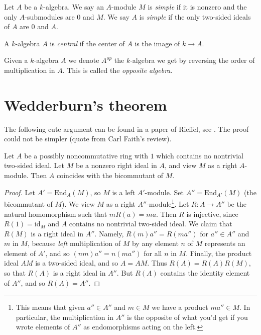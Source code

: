 \begin{definition}
\label{definition-simple}
Let $A$ be a $k$-algebra.
We say an $A$-module $M$ is {\it simple} if it is nonzero and
the only $A$-submodules are $0$ and $M$.
We say $A$ is {\it simple} if the only two-sided ideals of $A$ are
$0$ and $A$.
\end{definition}

\begin{definition}
\label{definition-central}
A $k$-algebra $A$ is {\it central} if the center of $A$ is the image of
$k \to A$.
\end{definition}

\begin{definition}
\label{definition-opposite}
Given a $k$-algebra $A$ we denote $A^{op}$ the $k$-algebra we get by
reversing the order of multiplication in $A$. This is called the
{\it opposite algebra}.
\end{definition}




\section{Wedderburn's theorem}
\label{section-wedderburn}

\noindent
The following cute argument can be found in a paper of Rieffel, see
\cite{Rieffel}. The proof could not be simpler (quote from
Carl Faith's review).

\begin{lemma}
\label{lemma-rieffel}
Let $A$ be a possibly noncommutative ring with $1$ which contains no
nontrivial two-sided ideal. Let $M$ be a nonzero right ideal in $A$,
and view $M$ as a right $A$-module. Then $A$ coincides with the
bicommutant of $M$.
\end{lemma}

\begin{proof}
Let $A' = \text{End}_A(M)$, so $M$ is a left $A'$-module.
Set $A'' = \text{End}_{A'}(M)$ (the bicommutant of $M$).
We view $M$ as a right $A''$-module\footnote{This
means that given $a'' \in A''$ and $m \in M$ we have a product
$m a'' \in M$. In particular, the multiplication in $A''$
is the opposite of what you'd get if you wrote elements of $A''$
as endomorphisms acting on the left.}.
Let $R : A \to A''$ be the natural homomorphism such that
$mR(a) = ma$. Then $R$ is injective, since $R(1) = \text{id}_M$
and $A$ contains no nontrivial two-sided ideal. We claim that $R(M)$
is a right ideal in $A''$. Namely, $R(m)a'' = R(ma'')$ for $a'' \in A''$
and $m$ in $M$, because {\it left} multiplication of $M$ by any element $n$
of $M$ represents an element of $A'$, and so
$(nm)a'' = n(ma'')$ for all $n$ in $M$.
Finally, the product ideal $AM$ is a two-sided ideal, and so
$A = AM$. Thus $R(A) = R(A)R(M)$, so that $R(A)$ is a right ideal in $A''$.
But $R(A)$ contains the identity element of $A''$, and so $R(A) = A''$.
\end{proof}

